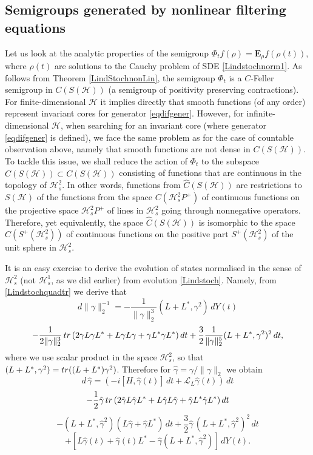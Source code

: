 \documentclass[10pt,a4paper]{amsart}
\def\LC{\mathcal{L}}
\def\HC{\mathcal{H}}
\def\E{\mathbf{E}}
\def\tr{\rm{tr}}
\def\ga{\gamma}
\begin{document}
\subsection{Semigroups generated by nonlinear filtering equations}

Let us look at the analytic properties of the semigroup $\Phi_tf(\rho)=\E_{\rho} f(\rho(t))$,
where $\rho(t)$ are solutions to the Cauchy problem of SDE \eqref{Lindstochnorm1}. As follows
from Theorem \ref{LindStochnonLin}, the semigroup $\Phi_t$ is a $C$-Feller semigroup in $C(S(\HC))$
(a semigroup of positivity preserving contractions). For finite-dimensional $\HC$ it implies directly
that smooth functions (of any order) represent invariant cores for generator \eqref{eqdifgener}.
However, for infinite-dimensional $\HC$, when searching for an invariant core
(where generator \eqref{eqdifgener} is defined), we face the same problem
as for the case of countable observation above, namely that smooth functions
 are not dense in $C(S(\HC))$. To tackle this issue, we shall reduce the action
 of $\Phi_t$ to the subspace $\hat C(S(\HC))\subset C(S(\HC))$ consisting of functions that
 are continuous in the topology of $\HC^2_s$. In other words, functions from $\hat C(S(\HC))$
 are restrictions to $S(\HC)$ of the functions from the space $C(\HC^2_sP^+)$ of continuous functions
 on the projective space $\HC^2_sP^+$ of lines in $\HC^2_s$ going through nonnegative operators. Therefore, yet equivalently,
 the space $\hat C(S(\HC))$ is isomorphic to the space $C(S^+(\HC^2_s))$ of continuous functions on
 the positive part $S^+(\HC^2_s)$ of the unit sphere in $\HC^2_s$.

It is an easy exercise to derive the evolution of states normalised in the sense of $\HC^2_s$
(not $\HC^1_s$, as we did earlier) from evolution \eqref{Lindstoch}. Namely,
from \eqref{Lindstochquadtr} we derive that
\[
d\|\ga\|_2^{-1}=-\frac{1}{\|\ga\|_2^3}(L+L^*,\ga^2)\, dY(t)
\]
\[
-\frac{1}{2\|\ga\|_2^3} \,{\tr}\, (2\ga L\ga L^*+L \ga L \ga + \ga L^* \ga L^*) \, dt
 +\frac32 \frac{1}{\|\ga\|_2^5} (L+L^*,\ga^2)^2\, dt,
 \]
 where we use scalar product in the space $\HC^2_s$, so that $(L+L^*,\ga^2)={\tr}((L+L^*)\ga^2)$.
Therefore for $\hat \ga=\ga/\|\ga\|_2$ we obtain
\[
d \, \hat  \ga=(-i[H,\hat \ga(t)] \, dt +\LC_L \hat \ga(t)) \, dt
\]
\[
-\frac12 \hat \ga \, {\tr} \,(2\hat \ga L\hat \ga L^*+ L \hat \ga L \hat \ga + \hat \ga L^* \hat \ga L^*) \, dt
\]
\[
-(L+L^*, \hat \ga^2) (L\hat \ga +\hat \ga L^*) \, dt+\frac32 \hat \ga \, (L+L^*, \hat \ga^2) ^2 \, dt
\]
\[
+[L\hat \ga(t)+\hat \ga(t) L^* -\hat \ga (L+L^*, \hat \ga^2)]\, dY(t).
\]
\end{document}
